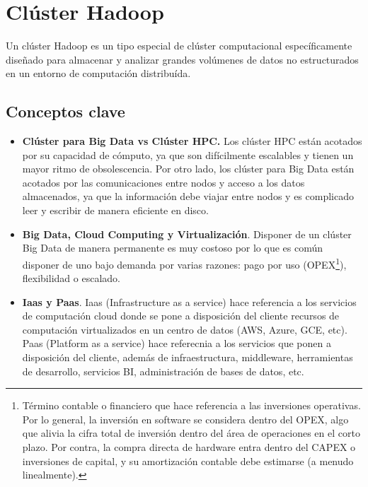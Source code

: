 \section{Clúster Hadoop}
Un clúster Hadoop es un tipo especial de clúster computacional específicamente diseñado para almacenar y analizar grandes volúmenes de datos no estructurados en un entorno de computación distribuída.
\subsection{Conceptos clave}
\begin{itemize}
	\item \textbf{Clúster para Big Data vs Clúster HPC.} Los clúster HPC están acotados por su capacidad de cómputo, ya que son difícilmente escalables y tienen un mayor ritmo de obsolescencia. Por otro lado, los clúster para Big Data están acotados por las comunicaciones entre nodos y acceso a los datos almacenados, ya que la información debe viajar entre nodos y es complicado leer y escribir de manera eficiente en disco.
	\item \textbf{Big Data, Cloud Computing y Virtualización}. Disponer de un clúster Big Data de manera permanente es muy costoso por lo que es común disponer de uno bajo demanda por varias razones: pago por uso (OPEX\footnote{Término contable o financiero que hace referencia a las inversiones operativas. Por lo general, la inversión en software se considera dentro del OPEX, algo que alivia la cifra total de inversión dentro del área de operaciones en el corto plazo. Por contra, la compra directa de hardware entra dentro del CAPEX o inversiones de capital, y su amortización contable debe estimarse (a menudo linealmente).}), flexibilidad o escalado.
	\item \textbf{Iaas y Paas}. Iaas (Infrastructure as a service) hace referencia a los servicios de computación cloud donde se pone a disposición del cliente recursos de computación virtualizados en un centro de datos (AWS, Azure, GCE, etc). Paas (Platform as a service) hace referecnia a los servicios que ponen a disposición del cliente, además de infraestructura, middleware, herramientas de desarrollo, servicios BI, administración de bases de datos, etc.
\end{itemize}
